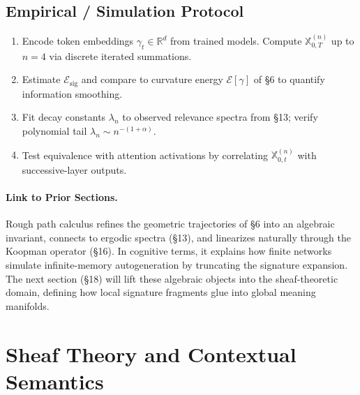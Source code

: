 \documentclass[12pt,a4paper,twoside,openright]{book}
\begin{document}
\subsection*{Empirical / Simulation Protocol}

\begin{enumerate}
\item Encode token embeddings $\gamma_t\in\mathbb{R}^d$ from trained models.  
Compute $\mathbb{X}^{(n)}_{0,T}$ up to $n=4$ via discrete iterated summations.
\item Estimate $\mathcal{E}_{\mathrm{sig}}$ and compare to curvature energy $\mathcal{E}[\gamma]$ of §6 to quantify information smoothing.
\item Fit decay constants $\lambda_n$ to observed relevance spectra from §13;  
verify polynomial tail $\lambda_n\!\sim\!n^{-(1+\alpha)}$.
\item Test equivalence with attention activations by correlating $\mathbb{X}^{(n)}_{0,t}$ with successive-layer outputs.
\end{enumerate}

\paragraph{Link to Prior Sections.}
Rough path calculus refines the geometric trajectories of §6 into an algebraic invariant, connects to ergodic spectra (§13), and linearizes naturally through the Koopman operator (§16).  
In cognitive terms, it explains how finite networks simulate infinite-memory autogeneration by truncating the signature expansion.  
The next section (§18) will lift these algebraic objects into the sheaf-theoretic domain, defining how local signature fragments glue into global meaning manifolds.



\section{Sheaf Theory and Contextual Semantics}
\label{sec:sheaf}
\end{document}
